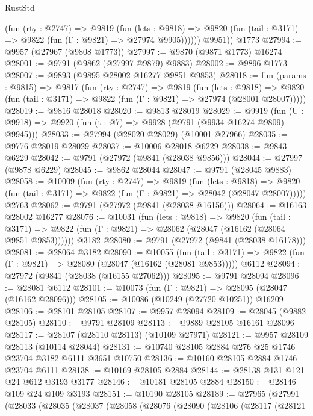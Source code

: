 \begin{lexlean}{RustStd}
\begin{coremodule}
            (fun (rty : @2747) =>
            @9819
              (fun (lets : @9818) =>
              @9820 (fun (tail : @3171) => @9822 (fun (Γ : @9821) => @27974 @9905))))))
        @9951))
    @1773
@27994 := @9957 (@27967 (@9808 @1773))
@27997 := @9870 (@9871 @1773) @16274
@28001 := @9791 (@9862 (@27997 @9879) @9883)
@28002 := @9896 @1773
@28007 := @9893 (@9895 @28002 @16277 @9851 @9853)
@28018 := fun (params : @9815) =>
  @9817
    (fun (rty : @2747) =>
    @9819
      (fun (lets : @9818) =>
      @9820 (fun (tail : @3171) => @9822 (fun (Γ : @9821) => @27974 (@28001 @28007)))))
@28019 := @9816 @28018
@28020 := @9813 @28019
@28029 := @9919
    (fun (U : @9918) => @9920 (fun (t : @7) => @9928 (@9791 (@9934 @16274 @9809) @9945)))
@28033 := @27994 (@28020 @28029) (@10001 @27966)
@28035 := @9776 @28019 @28029
@28037 := @10006 @28018 @6229
@28038 := @9843 @6229
@28042 := @9791 (@27972 (@9841 (@28038 @9856)))
@28044 := @27997 (@9878 @6229)
@28045 := @9862 @28044
@28047 := @9791 (@28045 @9883)
@28058 := @10009
    (fun (rty : @2747) =>
    @9819
      (fun (lets : @9818) =>
      @9820 (fun (tail : @3171) => @9822 (fun (Γ : @9821) => @28042 (@28047 @28007)))))
    @2763
@28062 := @9791 (@27972 (@9841 (@28038 @16156)))
@28064 := @16163 @28002 @16277
@28076 := @10031
    (fun (lets : @9818) =>
    @9820
      (fun (tail : @3171) =>
      @9822 (fun (Γ : @9821) => @28062 (@28047 (@16162 (@28064 @9851 @9853))))))
    @3182
@28080 := @9791 (@27972 (@9841 (@28038 @16178)))
@28081 := @28064 @3182
@28090 := @10055
    (fun (tail : @3171) => @9822 (fun (Γ : @9821) => @28080 (@28047 (@16162 (@28081 @9853)))))
    @6112
@28094 := @27972 (@9841 (@28038 (@16155 @27062)))
@28095 := @9791 @28094
@28096 := @28081 @6112
@28101 := @10073 (fun (Γ : @9821) => @28095 (@28047 (@16162 @28096)))
@28105 := @10086 (@10249 (@27720 @10251)) @16209
@28106 := @28101 @28105
@28107 := @9957 @28094
@28109 := @28045 (@9882 @28105)
@28110 := @9791 @28109
@28113 := @9889 @28105 @16161 @28096
@28117 := @28107 (@28110 @28113) (@10109 @27971)
@28121 := @9957 @28109 @28113 (@10114 @28044)
@28131 := @10740 @28105 @2884 @276 @25 @1746 @23704 @3182 @6111 @3651 @10750
@28136 := @10160 @28105 @2884 @1746 @23704 @6111
@28138 := @10169 @28105 @2884
@28144 := @28138 @131 @121 @24 @612 @3193 @3177
@28146 := @10181 @28105 @2884
@28150 := @28146 @109 @24 @109 @3193
@28151 := @10190 @28105
@28189 := @27965
    (@27991
      (@28033
        (@28035
          (@28037
            (@28058
              (@28076
                (@28090
                  (@28106
                    (@28117
                      (@28121

\end{coremodule}
\end{lexlean}

